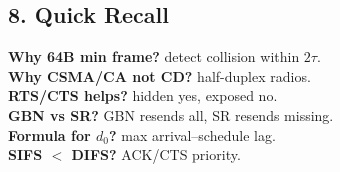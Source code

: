 \documentclass[10pt]{article}
\begin{document}
\begin{multicols*}{2}
\section*{8. Quick Recall}
\textbf{Why 64B min frame?} detect collision within $2\tau$.\\
\textbf{Why CSMA/CA not CD?} half-duplex radios.\\
\textbf{RTS/CTS helps?} hidden yes, exposed no.\\
\textbf{GBN vs SR?} GBN resends all, SR resends missing.\\
\textbf{Formula for $d_0$?} max arrival–schedule lag.\\
\textbf{SIFS $<$ DIFS?} ACK/CTS priority.\\

\end{multicols*}
\end{document}
